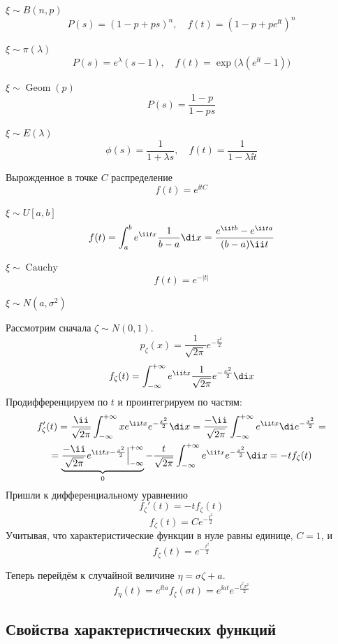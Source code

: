 \begin{exmpls}
\item $ \xi \sim B(n, p) $
    $$ P(s) = (1 - p + ps)^n, \quad f(t) = (1 - p + pe^{\ii t})^n $$
\item $ \xi \sim \pi(\lambda) $
    $$ P(s) = e^\lambda(s - 1), \quad f(t) = \exp \bigl( \lambda(e^{\ii t} - 1) \bigr) $$
\item $ \xi \sim \operatorname{Geom}(p) $
    $$ P(s) = \frac{1 - p}{1 - ps} $$
\item $ \xi \sim E(\lambda) $
    $$ \phi(s) = \frac1{1 + \lambda s}, \quad f(t) = \frac1{1 - \lambda \ii t} $$
\item Вырожденное в точке $ C $ распределение
    $$ f(t) = e^{\ii t C} $$
\item $ \xi \sim U[a, b] $
    $$ f(t) = \int_a^b e^{\ii t x} \frac1{b - a} \di x =
    \frac{e^{\ii tb} - e^{\ii ta}}{(b - a)\ii t} $$
\item $ \xi \sim \operatorname{Cauchy} $
    $$ f(t) = e^{-|t|} $$
\item $ \xi \sim N(a, \sigma^2) $

    Рассмотрим сначала $ \zeta \sim N(0, 1) $.
    $$ p_\zeta(x) = \frac1{\sqrt{2\pi}}e^{-\frac{x^2}2} $$
    $$ f_\zeta(t) = \int_{-\infty}^{+\infty} e^{\ii tx} \frac1{\sqrt{2\pi}} e^{-\frac{x^2}2} \di x $$
    Продифференцируем по $ t $ и проинтегрируем по частям:
    \begin{multline*}
        f_\zeta'(t) =
        \frac{\ii}{\sqrt{2\pi}} \int_{-\infty}^{+\infty} x e^{\ii t x} e^{-\frac{x^2}2} \di x =
        \frac{-\ii}{\sqrt{2\pi}} \int_{-\infty}^{+\infty} e^{\ii tx} \di e^{-\frac{x^2}2} = \\
        = \underbrace{\frac{-\ii}{\sqrt{2\pi}}e^{\ii t x - \frac{x^2}2}
        \Bigr|_{-\infty}^{+\infty}}_0 -
        \frac{t}{\sqrt{2\pi}} \int_{-\infty}^{+\infty} e^{\ii tx}e^{-\frac{x^2}2} \di x =
        -tf_\zeta(t)
    \end{multline*}
    Пришли к дифференциальному уравнению
    $$ f_\zeta'(t) = -tf_\zeta(t) $$
    $$ f_\zeta(t) = Ce^{-\frac{t^2}2} $$
    Учитывая, что характеристические функции в нуле равны единице, $ C = 1 $, и
    $$ f_\zeta(t) = e^{-\frac{t^2}2} $$

    Теперь перейдём к случайной величине $ \eta = \sigma \zeta + a $.
    $$ f_\eta(t) = e^{\ii ta} f_\zeta(\sigma t) = e^{\ii a t} e^{-\frac{t^2\sigma^2}2} $$
\end{exmpls}

\subsection{Свойства характеристических функций}

